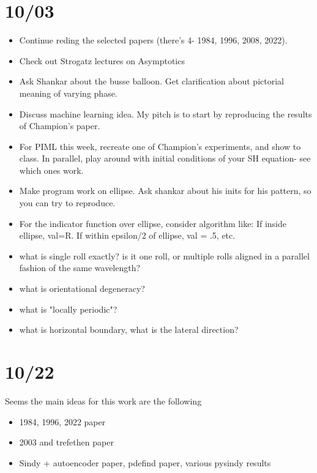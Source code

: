 \documentclass[12pt]{article}
\begin{document}
\section{10/03}
\begin{itemize}
\item Continue reding the selected papers (there's 4- 1984, 1996, 2008, 2022).
\item Check out Strogatz lectures on Asymptotics
\item Ask Shankar about the busse balloon. Get clarification about pictorial meaning of varying phase.
\item Discuss machine learning idea. My pitch is to start by reproducing the results of Champion's paper.
\item For PIML this week, recreate one of Champion's experiments, and show to class. In parallel, play around with initial conditions of your SH equation- see which ones work.
\item Make program work on ellipse. Ask shankar about his inits for his pattern, so you can try to reproduce.
\item For the indicator function over ellipse, consider algorithm like: If inside ellipse, val=R. If within epsilon/2 of ellipse, val = .5, etc.
\item what is single roll exactly? is it one roll, or multiple rolls aligned in a parallel fashion of the same wavelength?
\item what is orientational degeneracy?
\item what is "locally periodic"?
\item what is horizontal boundary, what is the lateral direction?
\end{itemize}
\section{10/22}
Seems the main ideas for this work are the following
\begin{itemize}
\item 1984, 1996, 2022 paper
\item 2003 and trefethen paper
\item Sindy + autoencoder paper, pdefind paper, various pysindy results
\end{itemize}
\end{document}
